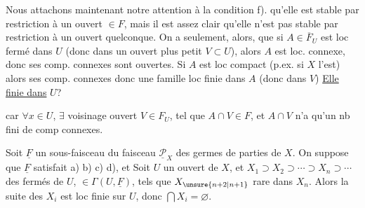 Nous attachons maintenant notre attention à la condition f).  qu'elle  est stable par restriction à un ouvert $\in F$, mais il est assez clair qu'elle n'est pas stable par restriction à un ouvert quelconque. On a seulement, alors, que si $A\in\overline F_U$ est loc fermé dans $U$ (donc  dans un ouvert plus petit $V\subset U$), alors $A$ est loc. connexe,  donc ses comp. connexes sont ouvertes. Si $A$ est loc compact (p.ex. si $X$ l'est) alors ses comp. connexes  donc une famille loc finie dans $A$ (donc dans $V$)  \uline{Elle}  \uline{ finie dans} $U$?

 car $\forall x\in U$, $\exists$ voisinage ouvert $V\in F_U$, tel que $A\cap V\in F$, et $A\cap V$ n'a qu'un nb fini de comp connexes.


Soit $\underline F$ un sous-faisceau du faisceau $\underline{\mathcal P}_X$ des germes de parties de $X$. On suppose que $\underline F$ satisfait a) b) c) d), et   Soit $U$ un ouvert de $X$, et $X_1\supset X_2\supset\cdots\supset X_n\supset\cdots$ des fermés de $U$, $\in\Gamma(U,\underline F)$, tels que $X_{\unsure{n+2|n+1}}$ rare dans $X_n$. Alors la suite des $X_i$ est loc finie sur $U$, donc $\bigcap X_i=\varnothing$.
